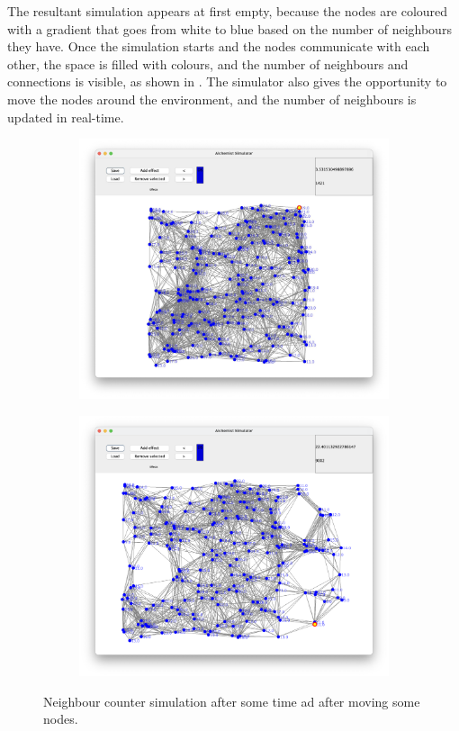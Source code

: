 The resultant simulation appears at first empty, because the nodes are coloured with a gradient that goes from white to
blue based on the number of neighbours they have.
Once the simulation starts and the nodes communicate with each other, the space is filled with colours, and the number of
neighbours and connections is visible, as shown in .
The simulator also gives the opportunity to move the nodes around the environment, and the number of neighbours is updated
in real-time.

\begin{figure}[ht!]
    \centering
    \begin{subfigure}[b]{0.49\textwidth}
        \centering
        \includegraphics[width=\textwidth]{figures/neighborCounter}
    \end{subfigure}
    \begin{subfigure}[b]{0.49\textwidth}
        \centering
        \includegraphics[width=\textwidth]{figures/neighborCounterMoved}
    \end{subfigure}
    \caption{Neighbour counter simulation after some time ad after moving some nodes.}
    \label{fig:neighbour-counter}
\end{figure}

